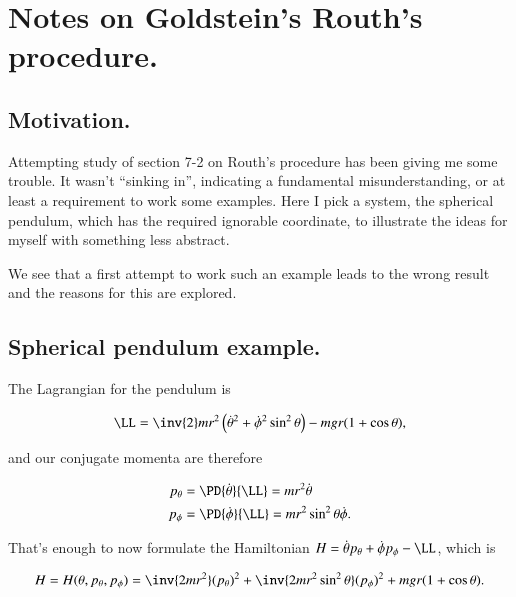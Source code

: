 %
%

\chapter{Notes on Goldstein's Routh's procedure.}
\label{chap:goldsteinRouth}
{}
\date{Mar 3, 2010}

\beginArtNoToc

\section{Motivation.}

Attempting study of \citep{goldstein1951cm} section 7-2 on Routh's procedure has been giving me some trouble.  It wasn't ``sinking in'', indicating a fundamental misunderstanding, or at least a requirement to work some examples.  Here I pick a system, the spherical pendulum, which has the required ignorable coordinate, to illustrate the ideas for myself with something less abstract.

We see that a first attempt to work such an example leads to the wrong result and the reasons for this are explored.

\section{Spherical pendulum example.}

The Lagrangian for the pendulum is

\begin{align}\label{eqn:goldsteinRouth:1}
\LL = \inv{2} m r^2 \left( \dot{\theta}^2 + \dot{\phi}^2 \sin^2 \theta \right) - m g r ( 1 + \cos\theta ),
\end{align}

and our conjugate momenta are therefore

\begin{align}\label{eqn:goldsteinRouth:2}
p_\theta &= \PD{\dot{\theta}}{\LL} = m r^2 \dot{\theta} \\
p_\phi &= \PD{\dot{\phi}}{\LL} = m r^2 \sin^2\theta \dot{\phi}.
\end{align}

That's enough to now formulate the Hamiltonian $H = \dot{\theta} p_\theta + \dot{\phi} p_\phi - \LL$, which is

\begin{align}\label{eqn:goldsteinRouth:3}
H = H(\theta, p_\theta, p_\phi) = \inv{2 m r^2 } (p_\theta)^2 + \inv{2 m r^2 \sin^2\theta} (p_\phi)^2 + m g r ( 1 + \cos\theta ).
\end{align}

